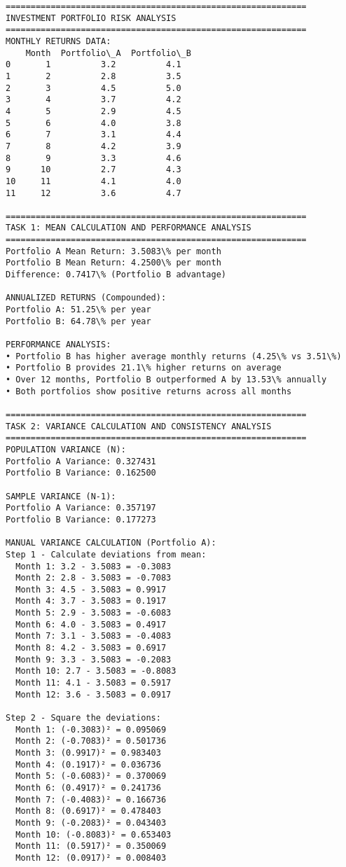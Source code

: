 \documentclass[11pt]{article}
\begin{document}
    \begin{Verbatim}[commandchars=\\\{\}]
============================================================
INVESTMENT PORTFOLIO RISK ANALYSIS
============================================================
MONTHLY RETURNS DATA:
    Month  Portfolio\_A  Portfolio\_B
0       1          3.2          4.1
1       2          2.8          3.5
2       3          4.5          5.0
3       4          3.7          4.2
4       5          2.9          4.5
5       6          4.0          3.8
6       7          3.1          4.4
7       8          4.2          3.9
8       9          3.3          4.6
9      10          2.7          4.3
10     11          4.1          4.0
11     12          3.6          4.7

============================================================
TASK 1: MEAN CALCULATION AND PERFORMANCE ANALYSIS
============================================================
Portfolio A Mean Return: 3.5083\% per month
Portfolio B Mean Return: 4.2500\% per month
Difference: 0.7417\% (Portfolio B advantage)

ANNUALIZED RETURNS (Compounded):
Portfolio A: 51.25\% per year
Portfolio B: 64.78\% per year

PERFORMANCE ANALYSIS:
• Portfolio B has higher average monthly returns (4.25\% vs 3.51\%)
• Portfolio B provides 21.1\% higher returns on average
• Over 12 months, Portfolio B outperformed A by 13.53\% annually
• Both portfolios show positive returns across all months

============================================================
TASK 2: VARIANCE CALCULATION AND CONSISTENCY ANALYSIS
============================================================
POPULATION VARIANCE (N):
Portfolio A Variance: 0.327431
Portfolio B Variance: 0.162500

SAMPLE VARIANCE (N-1):
Portfolio A Variance: 0.357197
Portfolio B Variance: 0.177273

MANUAL VARIANCE CALCULATION (Portfolio A):
Step 1 - Calculate deviations from mean:
  Month 1: 3.2 - 3.5083 = -0.3083
  Month 2: 2.8 - 3.5083 = -0.7083
  Month 3: 4.5 - 3.5083 = 0.9917
  Month 4: 3.7 - 3.5083 = 0.1917
  Month 5: 2.9 - 3.5083 = -0.6083
  Month 6: 4.0 - 3.5083 = 0.4917
  Month 7: 3.1 - 3.5083 = -0.4083
  Month 8: 4.2 - 3.5083 = 0.6917
  Month 9: 3.3 - 3.5083 = -0.2083
  Month 10: 2.7 - 3.5083 = -0.8083
  Month 11: 4.1 - 3.5083 = 0.5917
  Month 12: 3.6 - 3.5083 = 0.0917

Step 2 - Square the deviations:
  Month 1: (-0.3083)² = 0.095069
  Month 2: (-0.7083)² = 0.501736
  Month 3: (0.9917)² = 0.983403
  Month 4: (0.1917)² = 0.036736
  Month 5: (-0.6083)² = 0.370069
  Month 6: (0.4917)² = 0.241736
  Month 7: (-0.4083)² = 0.166736
  Month 8: (0.6917)² = 0.478403
  Month 9: (-0.2083)² = 0.043403
  Month 10: (-0.8083)² = 0.653403
  Month 11: (0.5917)² = 0.350069
  Month 12: (0.0917)² = 0.008403


\end{Verbatim}
\end{document}
